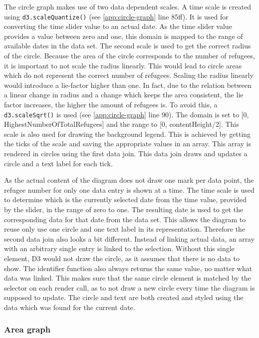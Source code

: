 The circle graph makes use of two data dependent scales. A time scale is created using \texttt{d3.scaleQuantize()} (see \ref{app:circle-graph} line 85ff). It is used for converting the time slider value to an actual date. As the time slider value provides a value between zero and one, this domain is mapped to the range of available dates in the data set. The second scale is used to get the correct radius of the circle. Because the area of the circle corresponds to the number of refugees, it is important to not scale the radius linearly. This would lead to circle areas which do not represent the correct number of refugees. Scaling the radius linearly would introduce a lie-factor higher than one. In fact, due to the relation between a linear change in radius and a change which keeps the area consistent, the lie factor increases, the higher the amount of refugees is. To avoid this, a \texttt{d3.scaleSqrt()} is used (see \ref{app:circle-graph} line 90). The domain is set to [0, HighestNumberOfTotalRefugees] and the range to [0, contentHeight/2]. This scale is also used for drawing the background legend. This is achieved by getting the ticks of the scale and saving the appropriate values in an array. This array is rendered in circles using the first data join. This data join draws and updates a circle and a text label for each tick.

As the actual content of the diagram does not draw one mark per data point, the refugee number for only one data entry is shown at a time. The time scale is used to determine which is the currently selected date from the time value, provided by the slider, in the range of zero to one. The resulting date is used to get the corresponding data for that date from the data set. This allows the diagram to reuse only use one circle and one text label in its representation. Therefore the second data join also looks a bit different. Instead of linking actual data, an array with an arbitrary single entry is linked to the selection. Without this single element, D3 would not draw the circle, as it assumes that there is no data to show. The identifier function also always returns the same value, no matter what data was linked. This makes sure that the same circle element is matched by the selector on each render call, as to not draw a new circle every time the diagram is supposed to update. The circle and text are both created and styled using the data which was found for the current date.

\subsubsection{Area graph}

